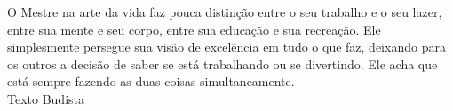 \begin{epigrafe}
\vspace*{\fill}

\flushright
\begin{minipage}[b][8cm][b]{8.5cm}
O Mestre na arte da vida faz pouca distinção entre
o seu trabalho e o seu lazer, entre sua mente e seu
corpo, entre sua educação e sua recreação. Ele
simplesmente persegue sua visão de excelência
em tudo o que faz, deixando para os outros a
decisão de saber se está trabalhando ou se
divertindo. Ele acha que está sempre fazendo as
duas coisas simultaneamente.\\
\flushright
Texto Budista
\end{minipage}


\end{epigrafe}
